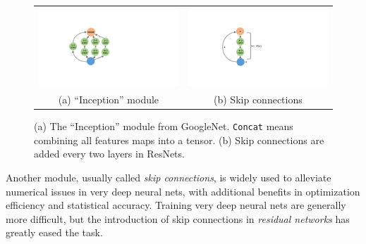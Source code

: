 \begin{figure}[htb!]
\centering
\begin{tabular}{cc}
\includegraphics[scale = 0.5]{inception} & \includegraphics[scale = 0.5]{resnet2} \tabularnewline
(a) ``Inception'' module & (b) Skip connections
\end{tabular}
\caption{(a) The ``Inception'' module from GoogleNet. \texttt{Concat} means combining all features maps into a tensor. (b) Skip connections are added every two layers in ResNets. }\label{fig:skip}
\end{figure}



Another module, usually called \textit{skip connections}, is widely used to alleviate numerical issues in very deep neural nets, with additional benefits in optimization efficiency and statistical accuracy. Training very deep neural nets are generally more difficult, but the introduction of skip connections in \emph{residual networks} \citep{he2016deep, he2016identity} has greatly eased the task. 

